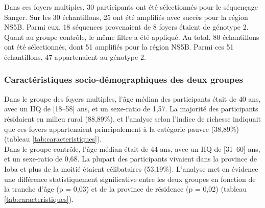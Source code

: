 \documentclass[a4paper,12pt]{article}
\begin{document}
Dans ces foyers multiples, 30 participants ont été sélectionnés pour le séquençage Sanger. Sur les 30 échantillons, 25 ont été amplifiés avec succès pour la région NS5B. Parmi eux, 18 séquences provenaient de 8 foyers étaient de génotype 2. \\


Quant au groupe contrôle, le même filtre a été appliqué. Au total, 80 échantillons ont été sélectionnés, dont 51 amplifiés pour la région NS5B. Parmi ces 51 échantillons, 47 appartenaient au génotype 2. 



    



\subsubsection{Caractéristiques socio-démographiques des deux groupes}

Dans le groupe des foyers multiples, l’âge médian des participants était de 40 ans, avec un IIQ de [18–58] ans, et un sexe-ratio de 1,57. La majorité des participants résidaient en milieu rural (88,89\%), et l’analyse selon l’indice de richesse indiquait que ces foyers appartenaient principalement à la catégorie pauvre (38,89\%) (tableau \ref{tab:caracteristiques}).\\

Dans le groupe contrôle, l’âge médian était de 44 ans, avec un IIQ de [31–60] ans, et un sexe-ratio de 0,68. La plupart des participants vivaient dans la province de Ioba et plus de la moitié étaient célibataires (53,19\%).
L’analyse met en évidence une différence statistiquement significative entre les deux groupes en fonction de la tranche d’âge (p = 0,03) et de la province de résidence (p = 0,02) (tableau \ref{tab:caracteristiques}).
\end{document}
